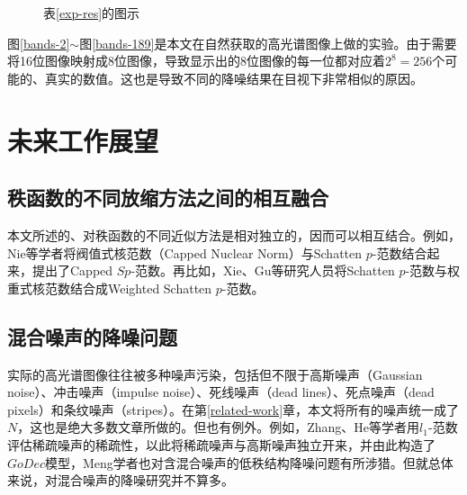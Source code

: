 \documentclass[12pt, a4paper]{article}
\begin{document}
\begin{figure}[h]
\caption{表\ref{exp-res}的图示}
\label{exp-types}
\end{figure}
	
\par 图\ref{bands-2}$\sim$图\ref{bands-189}是本文在自然获取的高光谱图像上做的实验。由于需要将16位图像映射成8位图像，导致显示出的8位图像的每一位都对应着$2^8=256$个可能的、真实的数值。这也是导致不同的降噪结果在目视下非常相似的原因。
\newpage
\section{未来工作展望}
\subsection{秩函数的不同放缩方法之间的相互融合}
\par 本文所述的、对秩函数的不同近似方法是相对独立的，因而可以相互结合。例如，Nie等学者将阀值式核范数（Capped Nuclear Norm）与Schatten $p$-范数结合起来，提出了Capped $Sp$-范数\cite{CNN-2}。再比如，Xie、Gu等研究人员将Schatten $p$-范数与权重式核范数结合成Weighted Schatten $p$-范数\cite{merge-2}。
\subsection{混合噪声的降噪问题}
\par 实际的高光谱图像往往被多种噪声污染，包括但不限于高斯噪声（Gaussian noise）、冲击噪声（impulse noise）、死线噪声（dead lines）、死点噪声（dead pixels）和条纹噪声（stripes）\cite{Mixture}。在第\ref{related-work}章，本文将所有的噪声统一成了$N$，这也是绝大多数文章所做的。但也有例外。例如，Zhang、He等学者用$l_1$-范数评估稀疏噪声的稀疏性，以此将稀疏噪声与高斯噪声独立开来，并由此构造了$GoDec$模型\cite{Mixture}，Meng学者也对含混合噪声的低秩结构降噪问题有所涉猎\cite{meng}。但就总体来说，对混合噪声的降噪研究并不算多。
\end{document}
